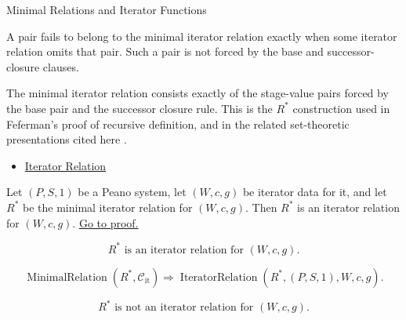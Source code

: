 \begin{topicbox}{Minimal Relations and Iterator Functions}
\begin{remark*}
A pair fails to belong to the minimal iterator relation exactly when some
iterator relation omits that pair. Such a pair is not forced by the base and
successor-closure clauses.
\end{remark*}

\begin{remark*}[Interpretation]
The minimal iterator relation consists exactly of the stage-value pairs forced
by the base pair and the successor closure rule. This is the $R^*$ construction
used in Feferman's proof of recursive definition, and in the related
set-theoretic presentations cited here
\citep{FefermanNumberSystems1964,hrbacek_jech1999,chi_recursion_wustl}.
\end{remark*}

\begin{dependencies}
\begin{itemize}
  \item \hyperref[def:iterator-relation]{Iterator Relation}
\end{itemize}
\end{dependencies}

\begin{tcolorbox}[colback=lembox, colframe=lemborder, arc=2pt,
  left=6pt, right=6pt, top=4pt, bottom=4pt,
  title={\small\textbf{Lemma (Consistency of the Minimal Iterator Relation)}},
  fonttitle=\small\bfseries]
\begin{lemma}
\label{lem:iterator-relation-consistency}
Let $(P,S,1)$ be a Peano system, let $(W,c,g)$ be iterator data for it, and let
$R^*$ be the minimal iterator relation for $(W,c,g)$. Then $R^*$ is an
iterator relation for $(W,c,g)$.
\hyperref[prf:iterator-relation-consistency]{Go to proof.}
\end{lemma}
\end{tcolorbox}

\begin{remark*}
\[
R^* \text{ is an iterator relation for } (W,c,g).
\]
\end{remark*}

\begin{remark*}
\[
\operatorname{MinimalRelation}(R^*,\mathcal C_{\mathrm{it}})
\Longrightarrow
\operatorname{IteratorRelation}(R^*,(P,S,1),W,c,g).
\]
\end{remark*}

\begin{remark*}
\[
R^* \text{ is not an iterator relation for } (W,c,g).
\]
\end{remark*}


\end{topicbox}
